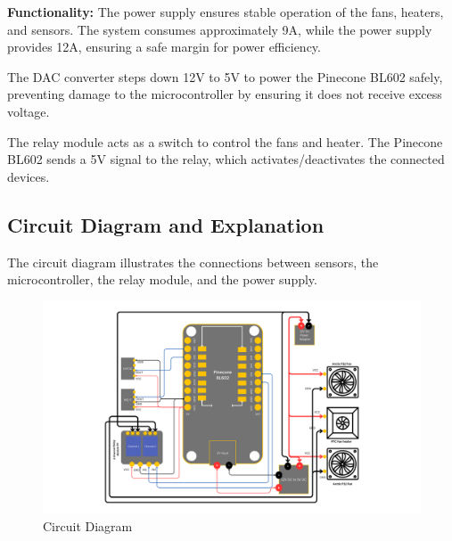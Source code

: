 \documentclass[a4paper]{scrartcl}
\begin{document}
\textbf{Functionality:}
The power supply ensures stable operation of the fans, heaters, and sensors. The system consumes approximately 9A, while the power supply provides 12A, ensuring a safe margin for power efficiency.

The DAC converter steps down 12V to 5V to power the Pinecone BL602 safely, preventing damage to the microcontroller by ensuring it does not receive excess voltage.

The relay module acts as a switch to control the fans and heater. The Pinecone BL602 sends a 5V signal to the relay, which activates/deactivates the connected devices.

\subsection{Circuit Diagram and Explanation}
The circuit diagram illustrates the connections between sensors, the microcontroller, the relay module, and the power supply.
\begin{figure}[H]
    \centering
    \includegraphics[width=1\textwidth]{images/CD.png}
    \caption{Circuit Diagram}
\end{figure}
\end{document}
